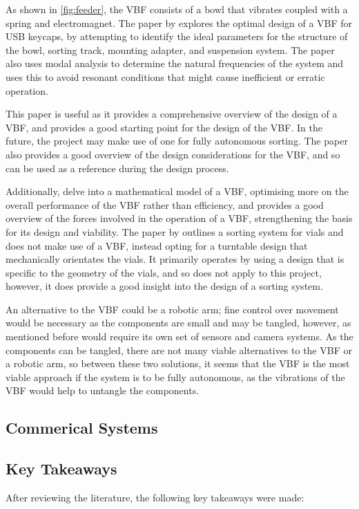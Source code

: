 As shown in \autoref{fig:feeder}, the VBF consists of a bowl that vibrates coupled with a spring and electromagnet. The paper by \citet{nam2019design} explores the optimal design of a VBF for USB keycaps, by attempting to identify the ideal parameters for the structure of the bowl, sorting track, mounting adapter, and suspension system. The paper also uses modal analysis to determine the natural frequencies of the system and uses this to avoid resonant conditions that might cause inefficient or erratic operation.

This paper is useful as it provides a comprehensive overview of the design of a VBF, and provides a good starting point for the design of the VBF. In the future, the project may make use of one for fully autonomous sorting. The paper also provides a good overview of the design considerations for the VBF, and so can be used as a reference during the design process.

Additionally, \citet{REINHART2010191} delve into a mathematical model of a VBF, optimising more on the overall performance of the VBF rather than efficiency, and \citet{ForceAnalysisofVibratoryBowlFeeder} provides a good overview of the forces involved in the operation of a VBF, strengthening the basis for its design and viability. The paper by \citet{zhang2019design} outlines a sorting system for vials and does not make use of a VBF, instead opting for a turntable design that mechanically orientates the vials. It primarily operates
by using a design that is specific to the geometry of the vials, and so does not apply to this project, however, it does provide a good insight into the design of a sorting system.

An alternative to the VBF could be a robotic arm; fine control over movement would be necessary as the components are small and may be tangled, however, as mentioned before would require its own set of sensors and camera systems. As the components can be tangled, there are not many viable alternatives to the VBF or a robotic arm, so between these two solutions, it seems that the VBF is the most viable approach if the system is to be fully autonomous, as the vibrations of the VBF would help to untangle the components.

\subsection{Commerical Systems}
\subsection{Key Takeaways}
After reviewing the literature, the following key takeaways were made:

